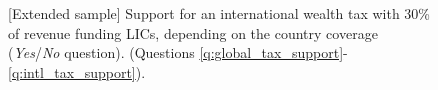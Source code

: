 \begin{figure}[h!]
    \caption[{[}Extended sample{]} Support for an int'l wealth tax depending on coverage]{[Extended sample] Support for an international wealth tax with 30\% of revenue funding LICs, depending on the country coverage (\textit{Yes}/\textit{No} question). \hfill (Questions \ref{q:global_tax_support}-\ref{q:intl_tax_support}).
    }\label{fig:wealth_tax_extended}
\end{figure}

